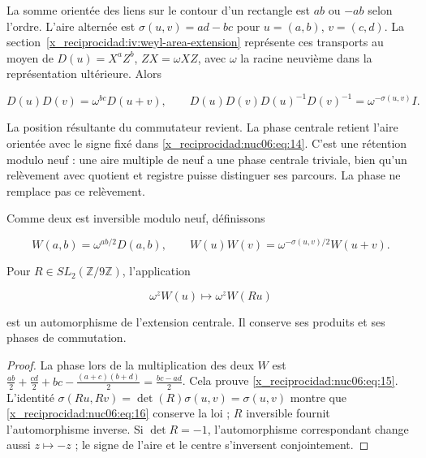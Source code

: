La somme orientée des liens sur le contour d’un rectangle est \(ab\) ou \(-ab\) selon l’ordre. L’aire alternée est \(\sigma(u,v)=ad-bc\) pour \(u=(a,b)\), \(v=(c,d)\). La section~\ref{x_reciprocidad:iv:weyl-area-extension} représente ces transports au moyen de \(D(u)=X^aZ^b\), \(ZX=\omega XZ\), avec \(\omega\) la racine neuvième dans la représentation ultérieure. Alors

\begin{equation}
D(u)D(v)=\omega^{bc}D(u+v),\qquad
D(u)D(v)D(u)^{-1}D(v)^{-1}=\omega^{-\sigma(u,v)}I.
\label{x_reciprocidad:nuc06:eq:14}
\end{equation}

La position résultante du commutateur revient. La phase centrale retient l’aire orientée avec le signe fixé dans \eqref{x_reciprocidad:nuc06:eq:14}. C’est une rétention modulo neuf : une aire multiple de neuf a une phase centrale triviale, bien qu’un relèvement avec quotient et registre puisse distinguer ses parcours. La phase ne remplace pas ce relèvement.

\begin{proposition}

Comme deux est inversible modulo neuf, définissons

\begin{equation}
W(a,b)=\omega^{ab/2}D(a,b),\qquad
W(u)W(v)=\omega^{-\sigma(u,v)/2}W(u+v).
\label{x_reciprocidad:nuc06:eq:15}
\end{equation}

Pour \(R\in SL_2(\mathbb Z/9\mathbb Z)\), l’application

\begin{equation}
\omega^zW(u)\longmapsto\omega^zW(Ru)
\label{x_reciprocidad:nuc06:eq:16}
\end{equation}

est un automorphisme de l’extension centrale. Il conserve ses produits et ses phases de commutation.
\end{proposition}

\begin{proof}
La phase lors de la multiplication des deux \(W\) est
\(\frac{ab}{2}+\frac{cd}{2}+bc-\frac{(a+c)(b+d)}2=\frac{bc-ad}{2}\). Cela prouve \eqref{x_reciprocidad:nuc06:eq:15}. L’identité \(\sigma(Ru,Rv)=\det(R)\sigma(u,v)=\sigma(u,v)\) montre que \eqref{x_reciprocidad:nuc06:eq:16} conserve la loi ; \(R\) inversible fournit l’automorphisme inverse. Si \(\det R=-1\), l’automorphisme correspondant change aussi \(z\mapsto-z\) ; le signe de l’aire et le centre s’inversent conjointement.
\end{proof}

